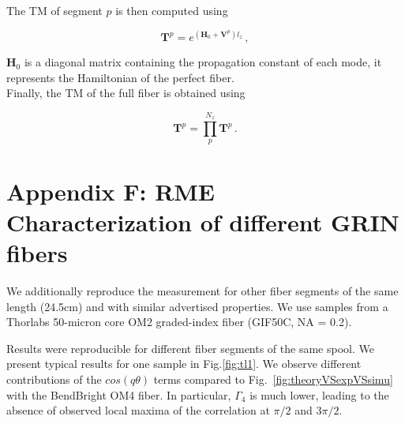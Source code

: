 \documentclass[aps,prl,twocolumn, amsmath,amssymb,superscriptaddress]{revtex4-2}
\begin{document}

The TM of segment $p$ is then computed using

\begin{equation}
   \mathbf{T}^p = e^{\left(\mathbf{H}_0 + \mathbf{V}^p \right) l_z} \, ,
\end{equation}

$\mathbf{H}_0$ is a diagonal matrix containing the propagation constant of each mode, 
it represents the Hamiltonian of the perfect fiber.\\


Finally, the TM of the full fiber is obtained using

\begin{equation}
   \mathbf{T}^p = \prod_p^{N_z}  \mathbf{T}^p  \, .
\end{equation}


\section*{Appendix F: RME Characterization of different GRIN fibers}

We additionally reproduce the measurement for other
fiber segments of the same length (24.5cm)
and with similar advertised properties.
We use samples from a 
Thorlabs 50-micron core OM2 graded-index fiber (GIF50C, NA = 0.2).

Results were reproducible for different fiber segments of the same spool. 
We present typical results for one sample in Fig.\ref{fig:tl1}.
We observe different contributions of the $cos(q\theta)$ terms 
compared to Fig.~\ref{fig:theoryVSexpVSsimu} with the BendBright OM4 fiber.
In particular, $\Gamma_4$ is much lower,
leading to the absence of observed local maxima
of the correlation at $\pi/2$ and $3\pi/2$.
\end{document}
